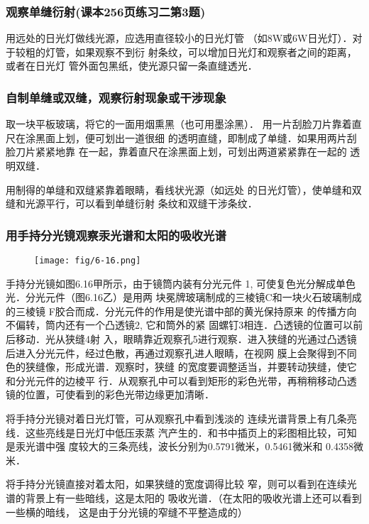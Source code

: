 \subsubsection{观察单缝衍射(课本256页练习二第3题)}
用远处的日光灯做线光源，应选用直径较小的日光灯管
（如8W或6W日光灯）．对于较粗的灯管，如果观察不到衍
射条纹，可以增加日光灯和观察者之间的距离，或者在日光灯
管外面包黑纸，使光源只留一条直缝透光．

\subsubsection{自制单缝或双缝，观察衍射现象或干涉现象}
取一块平板玻璃，将它的一面用烟熏黑（也可用墨涂黑）．
用一片刮脸刀片靠着直尺在涂黑面上划，便可划出一道很细
的透明直缝，即制成了单缝．如果用两片刮脸刀片紧紧地靠
在一起，靠着直尺在涂黑面上划，可划出两道紧紧靠在一起的
透明双缝．

用制得的单缝和双缝紧靠着眼睛，看线状光源（如远处
的日光灯管），使单缝和双缝和光源平行，可以看到单缝衍射
条纹和双缝干涉条纹．

\subsubsection{用手持分光镜观察汞光谱和太阳的吸收光谱}

\begin{figure}[htp]
    \centering
     \texttt{[image: fig/6-16.png]}
    \caption{}
\end{figure}

手持分光镜如图6.16甲所示，由于镜筒内装有分光元件
1, 可使复色光分解成单色光．分光元件（图6.16乙）是用两
块冕牌玻璃制成的三棱镜C和一块火石玻璃制成的三棱镜
F胶合而成．分光元件的作用是使光谱中部的黄光保持原来
的传播方向不偏转，筒内还有一个凸透镜2, 它和筒外的紧
固螺钉3相连．凸透镜的位置可以前后移动．光从狭缝4射
入，眼睛靠近观察孔5进行观察．进入狭缝的光通过凸透镜
后进入分光元件，经过色散，再通过观察孔进人眼睛，在视网
膜上会聚得到不同色的狭缝像，形成光谱．观察时，狭缝
的宽度要调整适当，并要转动狭缝，使它和分光元件的边棱平
行．从观察孔中可以看到矩形的彩色光带，再稍稍移动凸透
镜的位置，可使看到的彩色光带边缘更加清晰．

将手持分光镜对着日光灯管，可从观察孔中看到浅淡的
连续光谱背景上有几条亮线．这些亮线是日光灯中低压汞蒸
汽产生的．和书中插页上的彩图相比较，可知是汞光谱中强
度较大的三条亮线，波长分别为0.5791微米，0.5461微米和
0.4358微米．

将手持分光镜直接对着太阳，如果狭缝的宽度调得比较
窄，则可以看到在连续光谱的背景上有一些暗线，这是太阳的
吸收光谱．（在太阳的吸收光谱上还可以看到一些横的暗线，
这是由于分光镜的窄缝不平整造成的）


